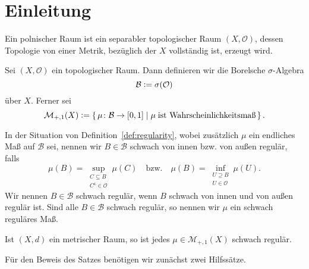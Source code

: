 \documentclass[../main/main.tex]{subfiles}
\begin{document}
	
	\section{Einleitung}
	
	
	\begin{Definition}
		Ein polnischer Raum ist ein separabler topologischer Raum $(X, \mathcal{O})$, 
		dessen Topologie von einer Metrik, bezüglich der $X$ vollständig ist, erzeugt wird.
	\end{Definition}

	\begin{Definition}
		\label{def:borel}
		Sei $(X, \mathcal{O})$ ein topologischer Raum. Dann definieren wir die Borelsche $\sigma$-Algebra
		$$\mathcal{B} \vcentcolon = \sigma(\mathcal{O})$$
		über $X$. Ferner sei
		$$\mathcal{M}_{+,1}(X) \vcentcolon = \left\{\, \mu \colon \mathcal{B} \to [0,1] \; | \; \mu \; \text{ist Wahrscheinlichkeitsmaß} \,\right\}\text{.}$$
	\end{Definition}

	\begin{Definition}
		\label{def:regularity}
		In der Situation von Definition~\ref{def:regularity}, wobei zusätzlich $\mu$ ein 
		endliches Maß auf $\mathcal{B}$ sei, nennen wir $B \in \mathcal{B}$ schwach von 
		innen bzw. von außen regulär, falls
		$$\mu(B) = \sup_{\substack{C \subseteq B \\ C^\mathsf{c} \in \mathcal{O}}} \mu(C) \quad \text{bzw.} \quad \mu(B) = \inf_{\substack{U \supseteq B \\ U \in \mathcal{O}}} \mu(U)\text{.}$$
		Wir nennen $B \in \mathcal{B}$ schwach regulär, wenn $B$ schwach von innen und 
		von außen regulär ist. Sind alle $B \in \mathcal{B}$ schwach regulär, 
		so nennen wir $\mu$ ein schwach reguläres Maß.
	\end{Definition}

	\begin{Satz}
		Ist $(X, d)$ ein metrischer Raum, so ist jedes $\mu \in \mathcal{M}_{+, 1}(X)$ 
		schwach regulär.
	\end{Satz}

	Für den Beweis des Satzes benötigen wir zunächst zwei Hilfssätze.
	
\end{document}

